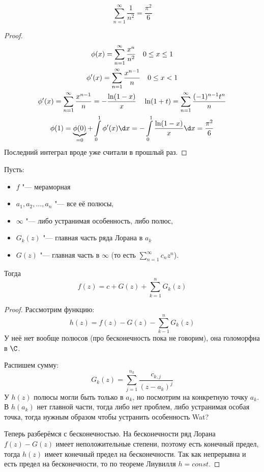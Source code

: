 \begin{theorem}
	\[ \sum_{n=1}^\infty \frac1{n^2} = \frac{\pi^2}6 \]
\end{theorem}

\begin{proof}
	\begin{gather*}
		\phi(x)
		= \sum_{n=1}^\infty \frac{x^n}{n^2} \quad 0 \le x \le 1 \\
		\phi'(x)
		= \sum_{n=1}^\infty \frac{x^{n-1}}n \quad 0 \le x < 1 \\
		\phi'(x)
		= \sum_{n=1}^\infty \frac{x^{n-1}}n
		= -\frac{\ln(1-x)}x \quad
		\ln(1 + t)
		= \sum_{n=1}^\infty \frac{(-1)^{n-1}t^n}n \\
		\phi(1)
		= \underbrace{\phi(0)}_{=0} + \int\limits_0^1 \phi'(x) \d x
		= -\int\limits_0^1 \frac{\ln(1-x)}x \d x
		= \frac{\pi^2}6
	\end{gather*}
	Последний интеграл вроде уже считали в прошлый раз.
\end{proof}

\begin{theorem}
	Пусть:
	\begin{itemize}
		\item $f$ "--- мераморная
		\item $a_1, a_2, \ldots, a_n$ "--- все её полюсы,
		\item $\infty$ "--- либо устранимая особенность, либо полюс,
		\item $G_k(z)$ "--- главная часть ряда Лорана в $a_k$
		\item $G(z)$ "--- главная часть в $\infty$ (то есть $\sum_{n=1}^\infty c_n z^n$).
	\end{itemize}
	Тогда
	\[ f(z) = c + G(z) + \sum_{k=1}^n G_k(z) \]
\end{theorem}

\begin{proof}
	Рассмотрим функцию:
	\[ h(z) = f(z) - G(z) - \sum_{k-1}^n G_k(z) \]
	У неё нет вообще полюсов (про бесконечность пока не говорим), она голоморфна в $\C$.

	Распишем сумму:
	\[ G_k(z) = \sum_{j=1}^{n_k} \frac{c_{k, j}}{(z-a_k)^j} \]
	У $h(z)$ полюсы могли быть только в $a_k$, но посмотрим на конкретную точку $a_k$.
	В $h(a_k)$ нет главной части, тогда либо нет проблем, либо устранимая особая точка,
	тогда нужным образом чтобы устранить особенность \TODO Wat?

	Теперь разберёмся с бесконечностью.
	На бесконечности ряд Лорана $f(z) - G(z)$ имеет неположительные степени,
	поэтому есть конечный предел, тогда $h(z)$ имеет конечный предел на бесконечности.
	Так как непрерывна и есть предел на бесконечности, то по теореме Лиувилля $h = const$.
\end{proof}

